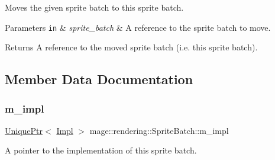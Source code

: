 Moves the given sprite batch to this sprite batch.


\begin{DoxyParams}[1]{Parameters}
\mbox{\tt in}  & {\em sprite\+\_\+batch} & A reference to the sprite batch to move. \\
\hline
\end{DoxyParams}
\begin{DoxyReturn}{Returns}
A reference to the moved sprite batch (i.\+e. this sprite batch). 
\end{DoxyReturn}


\subsection{Member Data Documentation}
\mbox{\label{classmage_1_1rendering_1_1_sprite_batch_ae4b2d9d7871bfbd057f1b09036373d75}} 
\subsubsection{\texorpdfstring{m\+\_\+impl}{m\_impl}}
{\footnotesize\ttfamily \mbox{\hyperlink{namespacemage_a3316d7143a973e37adf1110f2e80ca31}{Unique\+Ptr}}$<$ \mbox{\hyperlink{classmage_1_1rendering_1_1_sprite_batch_1_1_impl}{Impl}} $>$ mage\+::rendering\+::\+Sprite\+Batch\+::m\+\_\+impl\hspace{0.3cm}{\ttfamily [private]}}

A pointer to the implementation of this sprite batch. 